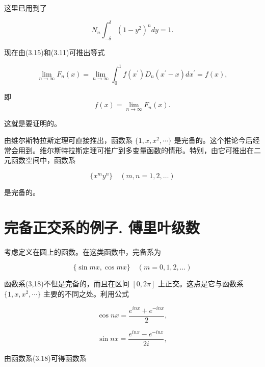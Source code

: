 这里已用到了

\begin{equation*}
N _ {n} \int_ {- \delta} ^ {\delta} (1 - y ^ {2}) ^ {n} d y = 1.
\end{equation*}

现在由(3.15)和(3.11)可推出等式

\begin{equation*}
\lim _ {n \rightarrow \infty} F _ {n} (x) = \lim _ {n \rightarrow \infty} \int_ {0} ^ {1} f \left(x ^ {\prime}\right) D _ {n} \left(x ^ {\prime} - x\right) d x ^ {\prime} = f (x),\tag{3.16}
\end{equation*}

即
\begin{equation*}
f (x) = \lim _ {n \rightarrow \infty} F _ {n} (x).
\end{equation*}

这就是要证明的。

由维尔斯特拉斯定理可直接推出，函数系 $\{1,x,x^{2},\cdots\}$ 是完备的。这个推论今后经常会用到。维尔斯特拉斯定理可推广到多变量函数的情形。特别，由它可推出在二元函数空间中，函数系

\begin{equation*}
\{x ^ {m} y ^ {n} \} \quad (m, n = 1, 2, \dots)\tag{3.17}
\end{equation*}

是完备的。

\section{完备正交系的例子. 傅里叶级数}

考虑定义在圆上的函数。在这类函数中，完备系为

\begin{equation*}
\{\sin m x, \cos m x \} \quad (m = 0, 1, 2, \dots)\tag{3.18}
\end{equation*}

函数系(3,18)不但是完备的，而且在区间 $\left[0,2\pi\right]$ 上正交。这点是它与函数系 $\{1,x,x^{2},\cdots\}$ 主要的不同之处。利用公式

\begin{equation*}
\cos n x = \frac {e ^ {i n x} + e ^ {- i n x}}{2},
\end{equation*}

\begin{equation*}
\sin n x = \frac {e ^ {i n x} - e ^ {- i n x}}{2 i},\tag{3.19}
\end{equation*}

由函数系(3.18)可得函数系

